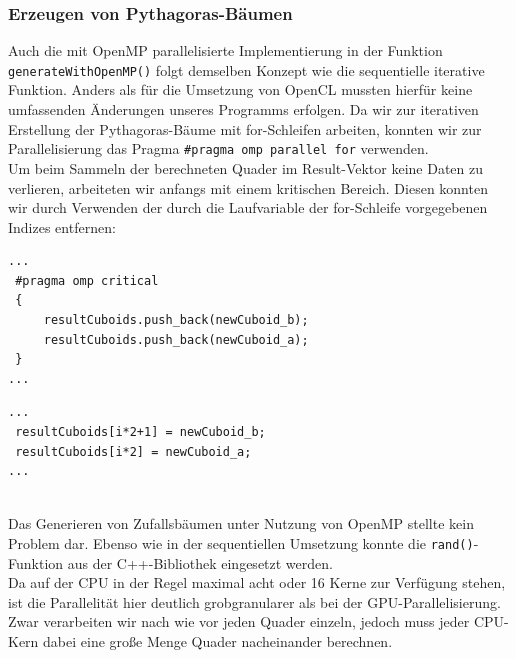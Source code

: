 \subsubsection*{Erzeugen von Pythagoras-Bäumen}
\vspace{-0.25cm}
Auch die mit OpenMP parallelisierte Implementierung in der Funktion \lstinline{generateWithOpenMP()} folgt demselben Konzept wie die sequentielle
iterative Funktion. Anders als für die Umsetzung von OpenCL mussten hierfür keine umfassenden Änderungen unseres Programms erfolgen. Da wir zur
iterativen Erstellung der Pythagoras-Bäume mit for-Schleifen arbeiten, konnten wir zur Parallelisierung das Pragma
\lstinline{#pragma omp parallel for} verwenden.\\
Um beim Sammeln der berechneten Quader im Result-Vektor keine Daten zu verlieren, arbeiteten wir anfangs mit einem kritischen Bereich. Diesen 
konnten wir durch Verwenden der durch die Laufvariable der for-Schleife vorgegebenen Indizes entfernen:
\vspace{0.25cm}\\
\begin{minipage}{0.58\linewidth}
\begin{lstlisting}[caption={Ausschnitt generateWithOpenMP(): Kritischer Bereich}]
...
 #pragma omp critical
 {
     resultCuboids.push_back(newCuboid_b);
     resultCuboids.push_back(newCuboid_a);
 }
...
\end{lstlisting}
\end{minipage}
\hfill
\begin{minipage}{0.35\linewidth}
\begin{lstlisting}[caption={Ersatz für kritischen Bereichs\\ i: Laufvariable for-Schleife}]
...
 resultCuboids[i*2+1] = newCuboid_b;
 resultCuboids[i*2] = newCuboid_a;
...
\end{lstlisting}
\end{minipage}
\vspace{0.25cm}\\
Das Generieren von Zufallsbäumen unter Nutzung von OpenMP stellte kein Problem dar. Ebenso wie in der sequentiellen Umsetzung konnte 
die \texttt{rand()}-Funktion aus der C++-Bibliothek eingesetzt werden.
\vspace{0.25cm}\\
Da auf der CPU in der Regel maximal acht oder 16 Kerne zur Verfügung stehen, ist die Parallelität hier deutlich grobgranularer als bei 
der GPU-Parallelisierung. Zwar verarbeiten wir nach wie vor jeden Quader einzeln, jedoch muss jeder CPU-Kern dabei eine große Menge Quader 
nacheinander berechnen. 

